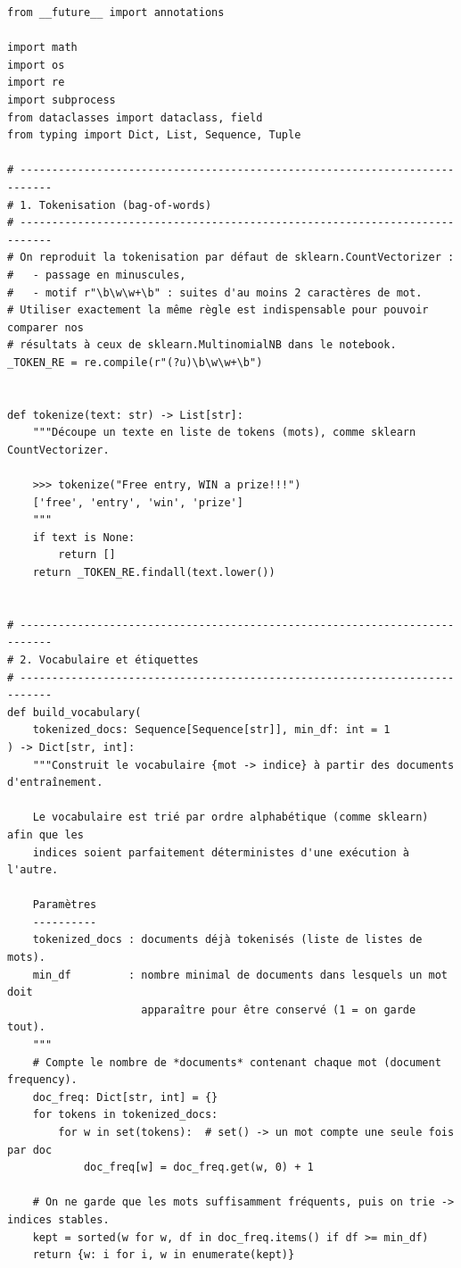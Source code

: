 \begin{lstlisting}[style=py]
from __future__ import annotations

import math
import os
import re
import subprocess
from dataclasses import dataclass, field
from typing import Dict, List, Sequence, Tuple

# ---------------------------------------------------------------------------
# 1. Tokenisation (bag-of-words)
# ---------------------------------------------------------------------------
# On reproduit la tokenisation par défaut de sklearn.CountVectorizer :
#   - passage en minuscules,
#   - motif r"\b\w\w+\b" : suites d'au moins 2 caractères de mot.
# Utiliser exactement la même règle est indispensable pour pouvoir comparer nos
# résultats à ceux de sklearn.MultinomialNB dans le notebook.
_TOKEN_RE = re.compile(r"(?u)\b\w\w+\b")


def tokenize(text: str) -> List[str]:
    """Découpe un texte en liste de tokens (mots), comme sklearn CountVectorizer.

    >>> tokenize("Free entry, WIN a prize!!!")
    ['free', 'entry', 'win', 'prize']
    """
    if text is None:
        return []
    return _TOKEN_RE.findall(text.lower())


# ---------------------------------------------------------------------------
# 2. Vocabulaire et étiquettes
# ---------------------------------------------------------------------------
def build_vocabulary(
    tokenized_docs: Sequence[Sequence[str]], min_df: int = 1
) -> Dict[str, int]:
    """Construit le vocabulaire {mot -> indice} à partir des documents d'entraînement.

    Le vocabulaire est trié par ordre alphabétique (comme sklearn) afin que les
    indices soient parfaitement déterministes d'une exécution à l'autre.

    Paramètres
    ----------
    tokenized_docs : documents déjà tokenisés (liste de listes de mots).
    min_df         : nombre minimal de documents dans lesquels un mot doit
                     apparaître pour être conservé (1 = on garde tout).
    """
    # Compte le nombre de *documents* contenant chaque mot (document frequency).
    doc_freq: Dict[str, int] = {}
    for tokens in tokenized_docs:
        for w in set(tokens):  # set() -> un mot compte une seule fois par doc
            doc_freq[w] = doc_freq.get(w, 0) + 1

    # On ne garde que les mots suffisamment fréquents, puis on trie -> indices stables.
    kept = sorted(w for w, df in doc_freq.items() if df >= min_df)
    return {w: i for i, w in enumerate(kept)}



\end{lstlisting}
